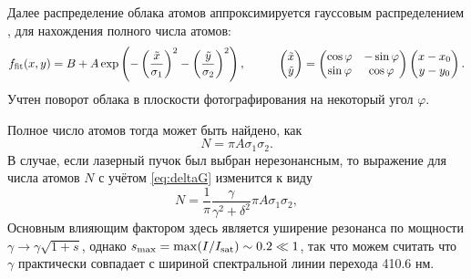 Далее распределение облака атомов аппроксимируется гауссовым распределением \cite{vlad} , для нахождения полного числа атомов:
\begin{equation}
    \sub{f}{fit}(x, y) = B+A \exp\left(
        - \left(\frac{\tilde{x}}{\sigma_1}\right)^2 - \left(\frac{\tilde{y}}{\sigma_2}\right)^2
    \right),
    \hspace{10 mm} 
    \begin{pmatrix}
        \tilde{x} \\ \tilde{y}
    \end{pmatrix} = \begin{pmatrix}
        \cos \varphi & -\sin \varphi  \\
        \sin \varphi & \cos \varphi  \\
    \end{pmatrix} \begin{pmatrix}
        x-x_0 \\ y - y_0
    \end{pmatrix}.
    \label{eq:photo_fit}
\end{equation}
Учтен поворот облака в плоскости фотографирования на некоторый угол $\varphi$. 

Полное число атомов тогда может быть найдено, как
\begin{equation}
    N = \pi A \sigma_1 \sigma_2.
\end{equation}
В случае, если лазерный пучок был выбран нерезонансным, то выражение для числа атомов $N$ с учётом \eqref{eq:deltaG} изменится к виду
\begin{equation}
    N = \frac{1}{\pi} \frac{\gamma}{\gamma^2+\delta^2} \pi A \sigma_1 \sigma_2,
\end{equation}
Основным влияющим фактором здесь является уширение резонанса по мощности $\gamma \to\gamma \sqrt{1+s}$, однако $s_{\textnormal{max}} = \max (I / I_{\textnormal{sat}}) \sim 0.2 \ll 1$, так что можем считать что $\gamma$ практически совпадает с шириной спектральной линии перехода 410.6 нм.



